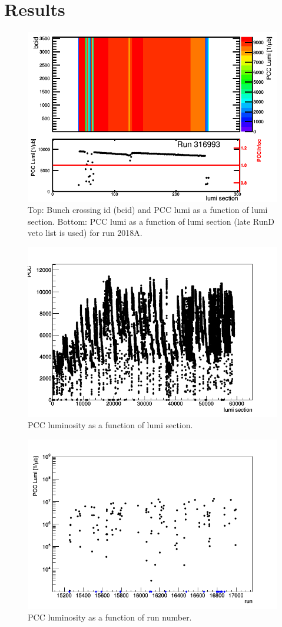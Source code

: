 \section{Results}
\label{sec:results}


\begin{figure}[H]
  \centering
  \includegraphics[width=0.52\columnwidth]{./316993.png}
  \caption{Top: Bunch crossing id (bcid) and PCC lumi as a function of lumi section. Bottom: PCC lumi as a function of lumi section (late RunD veto list is used) for run 2018A.}
  \label{fig:CMS}
\end{figure}


\begin{figure}[H]
  \centering
  \includegraphics[width=0.52\columnwidth]{./ls_lumi.png}
  \caption{PCC luminosity as a function of lumi section.}
  \label{fig:CMS}
\end{figure}


\begin{figure}[H]
  \centering
  \includegraphics[width=0.52\columnwidth]{./runs.png}
  \caption{PCC luminosity as a function of run number.}
  \label{fig:CMS}
\end{figure}


